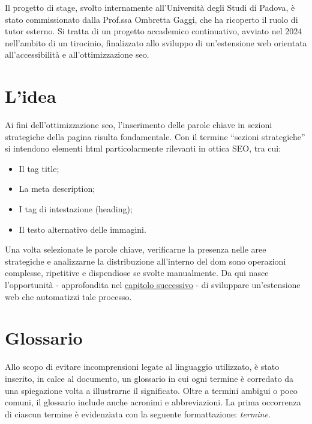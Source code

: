 \par Il progetto di stage, svolto internamente all’Università degli Studi di Padova, è stato commissionato dalla Prof.ssa Ombretta Gaggi, che ha ricoperto il ruolo di tutor esterno. Si tratta di un progetto accademico continuativo, avviato nel 2024 nell’ambito di un tirocinio, finalizzato allo sviluppo di un’estensione web orientata all’accessibilità e all’ottimizzazione \gls{seo}.

\section{L'idea}

\par Ai fini dell’ottimizzazione \gls{seo}, l’inserimento delle parole chiave in sezioni strategiche della pagina risulta fondamentale. Con il termine “sezioni strategiche” si intendono elementi \gls{html} particolarmente rilevanti in ottica SEO, tra cui:
\begin{itemize}
    \item Il tag title;
    \item La meta description;
    \item I tag di intestazione (heading);
    \item Il testo alternativo delle immagini.
\end{itemize}

\vspace{5pt}
\par\noindent Una volta selezionate le parole chiave, verificarne la presenza nelle aree strategiche e analizzarne la distribuzione all’interno del \gls{dom} sono operazioni complesse, ripetitive e dispendiose se svolte manualmente. Da qui nasce l’opportunità - approfondita nel \hyperref[cap:descrizione-progetto]{capitolo successivo} - di sviluppare un’estensione web che automatizzi tale processo.

\section{Glossario}

\par Allo scopo di evitare incomprensioni legate al linguaggio utilizzato, è stato inserito, in calce al documento, un glossario in cui ogni termine è corredato da una spiegazione volta a illustrarne il significato. Oltre a termini ambigui o poco comuni, il glossario include anche acronimi e abbreviazioni. La prima occorrenza di ciascun termine è evidenziata con la seguente formattazione: \textit{termine}\glsfirstoccur.

